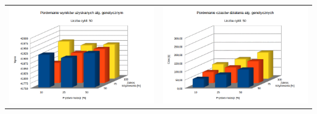 \documentclass[pdflatex,11pt]{../aghdoc_version2}
\begin{document}
\begin{tabular}{cc}
\includegraphics[width=0.4\paperwidth]{pics/porownanie2/wynik50.png} & 
\includegraphics[width=0.4\paperwidth]{pics/porownanie2/czas50.png} \\
	

\end{tabular}
\end{document}
